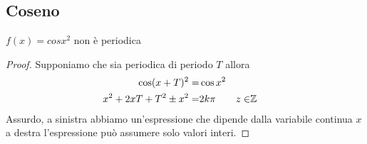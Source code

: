 \subsection{Coseno}
\begin{cexmp}
	$f(x)=cosx^2$ non è periodica
\end{cexmp}
\begin{proof}
	Supponiamo che sia periodica di periodo $T$ allora
	\begin{align*}
	\cos(x+T)^2=&\cos x^2\\
	x^2+2xT+T^2\pm x^2=&2k\pi&z\in&\mathbb{Z}\\
	\end{align*}
	Assurdo, a sinistra abbiamo un'espressione che dipende dalla variabile continua $x$ a destra l'espressione può assumere solo valori interi.
\end{proof}
